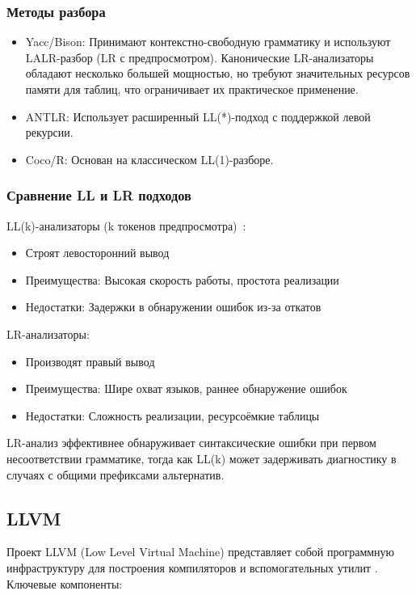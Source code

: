\subsubsection*{Методы разбора}
\begin{itemize}
    \item Yacc/Bison: Принимают контекстно-свободную грамматику и используют LALR-разбор (LR с предпросмотром). Канонические LR-анализаторы обладают несколько большей мощностью, но требуют значительных ресурсов памяти для таблиц, что ограничивает их практическое применение.
    
    \item ANTLR: Использует расширенный LL(*)-подход с поддержкой левой рекурсии.
    
    \item Coco/R: Основан на классическом LL(1)-разборе.
\end{itemize}

\subsubsection*{Сравнение LL и LR подходов}
LL(k)-анализаторы (k токенов предпросмотра)~\cite{aho2003}:
\begin{itemize}
    \item Строят левосторонний вывод
    \item Преимущества: Высокая скорость работы, простота реализации
    \item Недостатки: Задержки в обнаружении ошибок из-за откатов
\end{itemize}

LR-анализаторы:
\begin{itemize}
    \item Производят правый вывод
    \item Преимущества: Шире охват языков, раннее обнаружение ошибок
    \item Недостатки: Сложность реализации, ресурсоёмкие таблицы
\end{itemize}
LR-анализ эффективнее обнаруживает синтаксические ошибки при первом несоответствии грамматике, тогда как LL(k) может задерживать диагностику в случаях с общими префиксами альтернатив.

\subsection{LLVM}
Проект LLVM (Low Level Virtual Machine) представляет собой программную инфраструктуру для построения компиляторов и вспомогательных утилит \cite{sarda2015llvm}. Ключевые компоненты:

